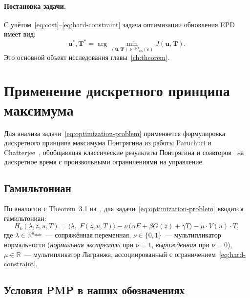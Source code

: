 \paragraph{Постановка задачи.} С учётом~\eqref{eq:cost}--\eqref{eq:hard-constraint}
задача оптимизации обновления EPD имеет вид:
\begin{equation}\label{eq:optimization-problem}
    \boxed{\;\mathbf{u}^*, \mathbf{T}^* = \arg\!\min_{(\mathbf{u}, \mathbf{T}) \in
        \mathcal{W}_{\mathrm{cb}}(\varepsilon)} J(\mathbf{u}, \mathbf{T}).\;}
\end{equation}
Это основной объект исследования главы~\ref{ch:theorem}.


\section{Применение дискретного принципа максимума}\label{sec:pmp-application}

Для анализа задачи~\eqref{eq:optimization-problem} применяется формулировка
дискретного принципа максимума Понтрягина из работы Paruchuri и
Chatterjee~\cite{paruchuri2019_discrete_pmp}, обобщающая классические
результаты Понтрягина и соавторов~\cite{pontryagin1983_optimal_processes} на
дискретное время с произвольными ограничениями на управление.

\subsection*{Гамильтониан}

По аналогии с Theorem~3.1 из~\cite{paruchuri2019_discrete_pmp}, для
задачи~\eqref{eq:optimization-problem} вводится гамильтониан:
\begin{equation}\label{eq:hamiltonian}
    H_k(\lambda, z, u, T) =
    \bigl\langle\lambda,\; F(z, u, T)\bigr\rangle
    - \nu\,\bigl(\alpha E + \beta G(z) + \gamma T\bigr)
    - \mu \cdot V(u) \cdot T,
\end{equation}
где $\lambda \in \mathbb{R}^{d_{\mathrm{state}}}$~--- сопряжённая
переменная, $\nu \in \{0, 1\}$~--- мультипликатор нормальности
(\emph{нормальная экстремаль} при $\nu = 1$, \emph{вырожденная} при $\nu = 0$),
$\mu \in \mathbb{R}$~--- мультипликатор Лагранжа, ассоциированный с
ограничением~\eqref{eq:hard-constraint}.

\subsection*{Условия PMP в наших обозначениях}

